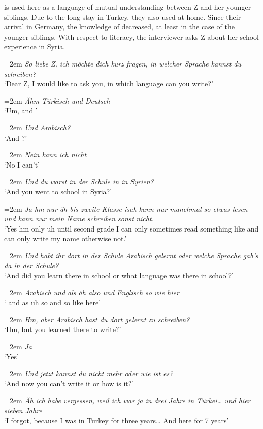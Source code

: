 \documentclass[output=paper,colorlinks,citecolor=brown]{langscibook}
\newenvironment{interview}{
  \setlength{\leftskip}{2.5em} %
  \setlength{\rightskip}{2.5em} %
  \setlength{\parindent}{0pt} %
  \vspace{\topsep} %
}{
  \vspace{\topsep} %
}
\newcommand{\speaker}[1]{%
  \noindent\hangindent=2em\makebox[1.5em][l]{#1:}\hspace{0.5em}%
}
\newcommand{\myattrib}[1]{%
    \attrib{#1}
}
\begin{document}
 is used here as a language of mutual understanding between Z and her younger siblings. Due to the long stay in Turkey, they also used  at home. Since their arrival in Germany, the knowledge of  decreased, at least in the case of the younger siblings. With respect to literacy, the interviewer asks Z about her school experience in Syria. 

\begin{interview}\label{ch2.5.ex.2}
\speaker{I}\textit{So liebe Z, ich möchte dich kurz fragen, in welcher Sprache kannst du schreiben?} \\
`Dear Z, I would like to ask you, in which language can you write?' 

\speaker{Z}\textit{Ähm Türkisch und Deutsch} \\
`Um,  and ' 

\speaker{I}\textit{Und Arabisch?} \\
`And ?' 

\speaker{Z}\textit{Nein kann ich nicht} \\
`No I can't' 

\speaker{I}\textit{Und du warst in der Schule in in Syrien?} \\
`And you went to school in Syria?' 

\speaker{Z}\textit{Ja hm nur äh bis zweite Klasse isch kann nur manchmal so etwas lesen und kann nur mein Name schreiben sonst nicht.} \\
`Yes hm only uh until second grade I can only sometimes read something like and can only write my name otherwise not.' 

\speaker{I}\textit{Und habt ihr dort in der Schule Arabisch gelernt oder welche Sprache gab's da in der Schule?} \\
`And did you learn  there in school or what language was there in school?' 

\speaker{Z}\textit{Arabisch und als äh also und Englisch so wie hier} \\
` and as uh so and  so like here' 

\speaker{I}\textit{Hm, aber Arabisch hast du dort gelernt zu schreiben?} \\
`Hm, but  you learned there to write?' 

\speaker{Z}\textit{Ja} \\
`Yes' 

\speaker{I}\textit{Und jetzt kannst du nicht mehr oder wie ist es?} \\
`And now you can't write it or how is it?' 

\speaker{Z}\textit{Äh ich habe vergessen, weil ich war ja in drei Jahre in Türkei… und hier sieben Jahre} \\
`I forgot, because I was in Turkey for three years… And here for 7 years' 
\myattrib{Int 1\_Z II, 1--30}
\end{interview}
\end{document}
